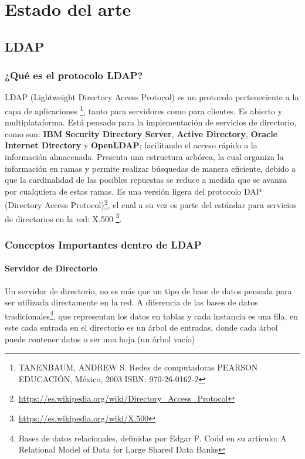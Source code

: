 \chapter{Estado del arte}

\section{LDAP}
\subsection{¿Qué es el protocolo LDAP?}
LDAP (Lightweight Directory Access Protocol) es un protocolo perteneciente a la capa de 
aplicaciones \footnote{ TANENBAUM, ANDREW S. Redes de computadoras PEARSON EDUCACIÓN, México, 
2003 ISBN: 970-26-0162-2}, tanto para servidores como para clientes. Es abierto y 
multiplataforma. Está pensado para la implementación de servicios de directorio, como son: 
\textbf{IBM Security Directory Server}, \textbf{Active Directory}, \textbf{Oracle Internet 
Directory} y \textbf{OpenLDAP}; facilitando el acceso rápido a la información almacenada. 
Presenta una estructura arbórea, la cual organiza la información en ramas y permite realizar 
búsquedas de manera eficiente, debido a que la cardinalidad de las posibles repuestas se 
reduce a medida que se avanza por cualquiera de estas ramas. Es una versión ligera del 
protocolo DAP (Directory Access Protocol)\footnote{ \url{https://es.wikipedia.org/wiki/Directory_Access_Protocol}},
el cual a su vez es parte del estándar para servicios de directorios en la red: X.500
\footnote{ \url{https://es.wikipedia.org/wiki/X.500}}.

\newpage

\subsection{Conceptos Importantes dentro de LDAP}

\subsubsection{Servidor de Directorio}
Un servidor de directorio, no es más que un tipo de base de datos pensada para ser utilizada 
directamente en la red. A diferencia de las bases de datos tradicionales\footnote{Bases de 
datos relacionales, definidas por Edgar F. Codd en su artículo: A Relational Model of Data 
for Large Shared Data Banks}, que representan los datos en tablas y cada instancia es una 
fila, en este cada entrada en el directorio es un árbol de entradas, donde cada árbol puede 
contener datos o ser una hoja (un árbol vacío)
	
